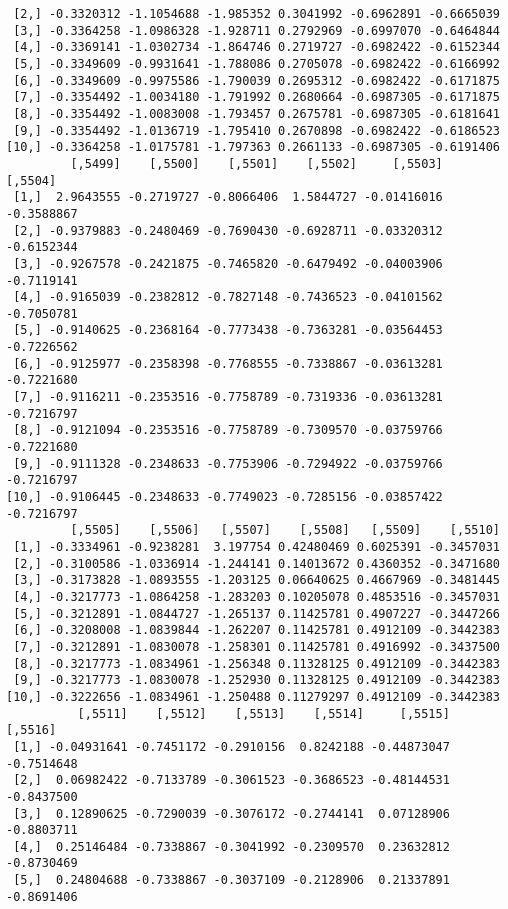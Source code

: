 \documentclass[
  letterpaper,
  DIV=11,
  numbers=noendperiod]{scrreprt}
\begin{document}
\begin{verbatim}
 [2,] -0.3320312 -1.1054688 -1.985352 0.3041992 -0.6962891 -0.6665039
 [3,] -0.3364258 -1.0986328 -1.928711 0.2792969 -0.6997070 -0.6464844
 [4,] -0.3369141 -1.0302734 -1.864746 0.2719727 -0.6982422 -0.6152344
 [5,] -0.3349609 -0.9931641 -1.788086 0.2705078 -0.6982422 -0.6166992
 [6,] -0.3349609 -0.9975586 -1.790039 0.2695312 -0.6982422 -0.6171875
 [7,] -0.3354492 -1.0034180 -1.791992 0.2680664 -0.6987305 -0.6171875
 [8,] -0.3354492 -1.0083008 -1.793457 0.2675781 -0.6987305 -0.6181641
 [9,] -0.3354492 -1.0136719 -1.795410 0.2670898 -0.6982422 -0.6186523
[10,] -0.3364258 -1.0175781 -1.797363 0.2661133 -0.6987305 -0.6191406
         [,5499]    [,5500]    [,5501]    [,5502]     [,5503]    [,5504]
 [1,]  2.9643555 -0.2719727 -0.8066406  1.5844727 -0.01416016 -0.3588867
 [2,] -0.9379883 -0.2480469 -0.7690430 -0.6928711 -0.03320312 -0.6152344
 [3,] -0.9267578 -0.2421875 -0.7465820 -0.6479492 -0.04003906 -0.7119141
 [4,] -0.9165039 -0.2382812 -0.7827148 -0.7436523 -0.04101562 -0.7050781
 [5,] -0.9140625 -0.2368164 -0.7773438 -0.7363281 -0.03564453 -0.7226562
 [6,] -0.9125977 -0.2358398 -0.7768555 -0.7338867 -0.03613281 -0.7221680
 [7,] -0.9116211 -0.2353516 -0.7758789 -0.7319336 -0.03613281 -0.7216797
 [8,] -0.9121094 -0.2353516 -0.7758789 -0.7309570 -0.03759766 -0.7221680
 [9,] -0.9111328 -0.2348633 -0.7753906 -0.7294922 -0.03759766 -0.7216797
[10,] -0.9106445 -0.2348633 -0.7749023 -0.7285156 -0.03857422 -0.7216797
         [,5505]    [,5506]   [,5507]    [,5508]   [,5509]    [,5510]
 [1,] -0.3334961 -0.9238281  3.197754 0.42480469 0.6025391 -0.3457031
 [2,] -0.3100586 -1.0336914 -1.244141 0.14013672 0.4360352 -0.3471680
 [3,] -0.3173828 -1.0893555 -1.203125 0.06640625 0.4667969 -0.3481445
 [4,] -0.3217773 -1.0864258 -1.283203 0.10205078 0.4853516 -0.3457031
 [5,] -0.3212891 -1.0844727 -1.265137 0.11425781 0.4907227 -0.3447266
 [6,] -0.3208008 -1.0839844 -1.262207 0.11425781 0.4912109 -0.3442383
 [7,] -0.3212891 -1.0830078 -1.258301 0.11425781 0.4916992 -0.3437500
 [8,] -0.3217773 -1.0834961 -1.256348 0.11328125 0.4912109 -0.3442383
 [9,] -0.3217773 -1.0830078 -1.252930 0.11328125 0.4912109 -0.3442383
[10,] -0.3222656 -1.0834961 -1.250488 0.11279297 0.4912109 -0.3442383
          [,5511]    [,5512]    [,5513]    [,5514]     [,5515]    [,5516]
 [1,] -0.04931641 -0.7451172 -0.2910156  0.8242188 -0.44873047 -0.7514648
 [2,]  0.06982422 -0.7133789 -0.3061523 -0.3686523 -0.48144531 -0.8437500
 [3,]  0.12890625 -0.7290039 -0.3076172 -0.2744141  0.07128906 -0.8803711
 [4,]  0.25146484 -0.7338867 -0.3041992 -0.2309570  0.23632812 -0.8730469
 [5,]  0.24804688 -0.7338867 -0.3037109 -0.2128906  0.21337891 -0.8691406

\end{verbatim}
\end{document}
